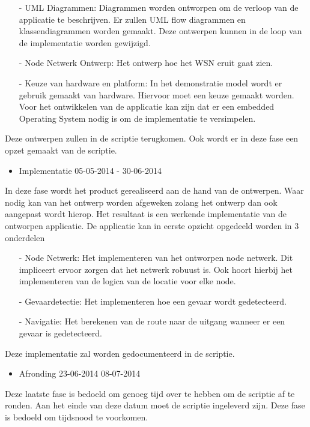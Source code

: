 \begin{itemize}
\item[-] UML Diagrammen: Diagrammen worden ontworpen om de verloop van de applicatie te beschrijven. Er zullen UML flow diagrammen en klassendiagrammen worden gemaakt. Deze ontwerpen kunnen in de loop van de implementatie worden gewijzigd.
\item[-] Node Netwerk Ontwerp: Het ontwerp hoe het WSN eruit gaat zien.
\item[-] Keuze van hardware en platform: In het demonstratie model wordt er gebruik gemaakt van hardware. Hiervoor moet een keuze gemaakt worden. Voor het ontwikkelen van de applicatie kan zijn dat er een embedded Operating System nodig is om de implementatie te versimpelen.
\end{itemize}

Deze ontwerpen zullen in de scriptie terugkomen. Ook wordt er in deze fase een opzet gemaakt van de scriptie.

\begin{itemize}
\item Implementatie 05-05-2014 - 30-06-2014
\end{itemize}
In deze fase wordt het product gerealiseerd aan de hand van de ontwerpen. Waar nodig kan van het ontwerp worden afgeweken zolang het ontwerp dan ook aangepast wordt hierop. Het resultaat is een werkende implementatie van de ontworpen applicatie. De applicatie kan in eerste opzicht opgedeeld worden in 3 onderdelen 
\begin{itemize}
\item[-] Node Netwerk: Het implementeren van het ontworpen node netwerk. Dit impliceert ervoor zorgen dat het netwerk robuust is. Ook hoort hierbij het implementeren van de logica van de locatie voor elke node.
\item[-] Gevaardetectie: Het implementeren hoe een gevaar wordt gedetecteerd.
\item[-] Navigatie: Het berekenen van de route naar de uitgang wanneer er een gevaar is gedetecteerd.
\end{itemize}

\noindent Deze implementatie zal worden gedocumenteerd in de scriptie.

\begin{itemize}
\item Afronding 23-06-2014 08-07-2014
\end{itemize}
Deze laatste fase is bedoeld om genoeg tijd over te hebben om de scriptie af te ronden. Aan het einde van deze datum moet de scriptie ingeleverd zijn. Deze fase is bedoeld om tijdsnood te voorkomen.

